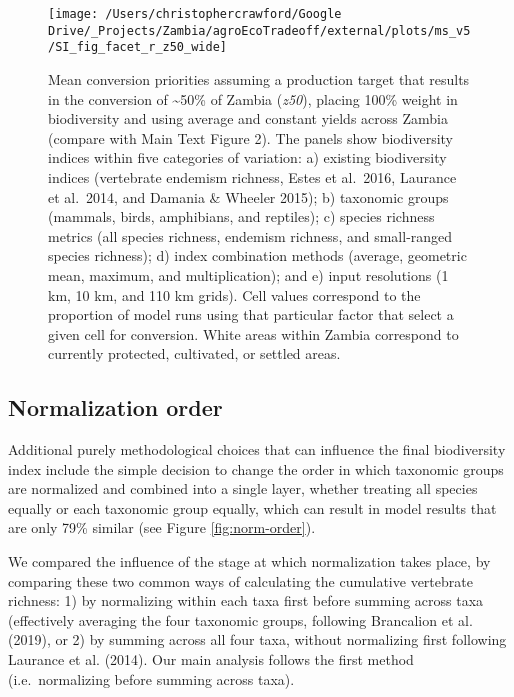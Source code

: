 \documentclass[
]{article}
\begin{document}
\begin{figure}
\texttt{[image: /Users/christophercrawford/Google Drive/\_Projects/Zambia/agroEcoTradeoff/external/plots/ms\_v5/SI\_fig\_facet\_r\_z50\_wide]} \caption{Mean conversion priorities assuming a production target that results in the conversion of \textasciitilde50\% of Zambia (\emph{z50}), placing 100\% weight in biodiversity and using average and constant yields across Zambia (compare with Main Text Figure 2). The panels show biodiversity indices within five categories of variation: a) existing biodiversity indices (vertebrate endemism richness, Estes et al.~2016, Laurance et al.~2014, and Damania \& Wheeler 2015); b) taxonomic groups (mammals, birds, amphibians, and reptiles); c) species richness metrics (all species richness, endemism richness, and small-ranged species richness); d) index combination methods (average, geometric mean, maximum, and multiplication); and e) input resolutions (1 km, 10 km, and 110 km grids). Cell values correspond to the proportion of model runs using that particular factor that select a given cell for conversion. White areas within Zambia correspond to currently protected, cultivated, or settled areas.}\label{fig:facet-r-z50}
\end{figure}

\newpage

\hypertarget{section-norm-order}{%
\subsection{Normalization order}\label{section-norm-order}}

Additional purely methodological choices that can influence the final biodiversity index include the simple decision to change the order in which taxonomic groups are normalized and combined into a single layer, whether treating all species equally or each taxonomic group equally, which can result in model results that are only 79\% similar (see Figure \ref{fig:norm-order}).

We compared the influence of the stage at which normalization takes place, by comparing these two common ways of calculating the cumulative vertebrate richness: 1) by normalizing within each taxa first before summing across taxa (effectively averaging the four taxonomic groups, following Brancalion et al. (2019), or 2) by summing across all four taxa, without normalizing first following Laurance et al. (2014). Our main analysis follows the first method (i.e.~normalizing before summing across taxa).
\end{document}
